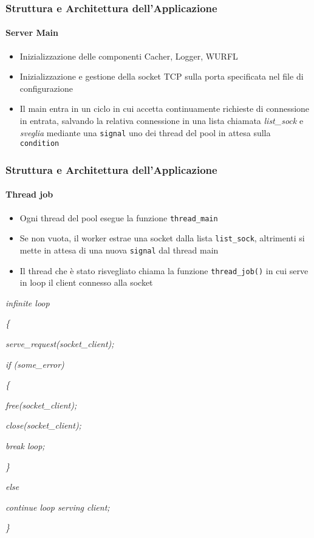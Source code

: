 \documentclass{beamer}
\begin{document}
\begin{frame}
\frametitle{Struttura e Architettura dell'Applicazione}
\framesubtitle{Server Main}

\begin{itemize}
\item Inizializzazione delle componenti Cacher, Logger, WURFL
\item Inizializzazione e gestione della socket TCP sulla porta specificata nel file di configurazione
\item Il main entra in un ciclo in cui accetta continuamente richieste di connessione in entrata, salvando la relativa connessione in una lista chiamata \textit{list\_sock} e \textit{sveglia} mediante una \texttt{signal} uno dei thread del pool in attesa sulla \texttt{condition}
\end{itemize}

\end{frame}



\begin{frame}
\frametitle{Struttura e Architettura dell'Applicazione}
\framesubtitle{Thread job}

\begin{itemize}
\item Ogni thread del pool esegue la funzione \texttt{thread\_main}
\item Se non vuota, il worker
estrae una socket dalla lista \texttt{list\_sock}, altrimenti si mette in attesa di una nuova
\texttt{signal} dal thread main
\item   Il thread che è stato risvegliato chiama la funzione
\texttt{thread\_job()} in cui serve in loop il client connesso alla socket
\end{itemize}

\medskip
\scriptsize
\setlength{\parindent}{30pt} \textit{infinite loop}

\setlength{\parindent}{32pt} \textit{\{}

\setlength{\parindent}{50pt} \textit{serve\_request(socket\_client);}

\setlength{\parindent}{50pt} \textit{if (some\_error)}

\setlength{\parindent}{52pt} \textit{\{}


\setlength{\parindent}{70pt} \textit{free(socket\_client);}

\setlength{\parindent}{70pt} \textit{close(socket\_client);}

\setlength{\parindent}{70pt} \textit{break loop;}


\setlength{\parindent}{52pt} \textit{\}}

\setlength{\parindent}{50pt} \textit{else}


\setlength{\parindent}{70pt} \textit{continue loop serving client;}

\setlength{\parindent}{32pt} \textit{\}}
\normalsize
\end{frame}
\end{document}
